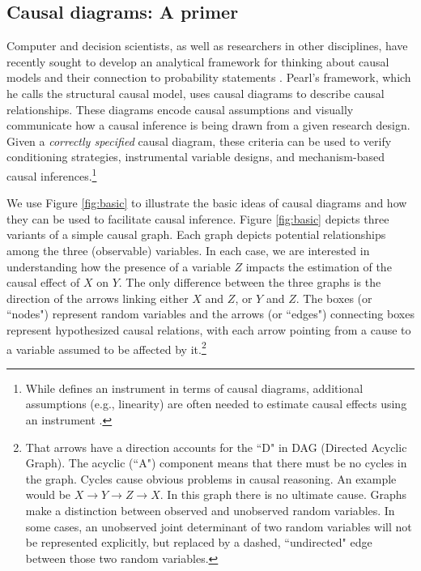 \documentclass[12pt,reqno,titlepage]{amsart}
\begin{document}
\begin{doublespace}
\subsection{Causal diagrams: A primer}
Computer and decision scientists, as well as researchers in other disciplines, have recently sought to develop an analytical framework for thinking about causal models and their connection to probability statements \citep{Pearl:2009kh}.
Pearl's framework, which he calls the structural causal model, uses causal diagrams to describe causal relationships. 
These diagrams encode causal assumptions and visually communicate how a causal inference is being drawn from a given research design.
Given a \emph{correctly specified} causal diagram, these criteria can be used to verify conditioning strategies, instrumental variable designs, and mechanism-based causal inferences.\footnote{While \citet[p.248]{Pearl:2009kh} defines an instrument in terms of causal diagrams, additional assumptions (e.g., linearity) are often needed to estimate causal effects using an instrument \citep{Angrist:1996p7456}.}

We use Figure \ref{fig:basic} to illustrate the basic ideas of causal diagrams and how they can be used to facilitate causal inference.
Figure \ref{fig:basic} depicts three variants of a simple causal graph. Each graph depicts potential relationships among the three (observable) variables.
In each case, we are interested in understanding how the presence of a variable $Z$ impacts the estimation of the causal effect of $X$ on $Y$.
The only difference between the three graphs is the direction of the arrows linking either $X$ and $Z$, or $Y$ and $Z$.
The boxes (or ``nodes") represent random variables and the arrows (or ``edges") connecting boxes represent hypothesized causal relations, with each arrow pointing from a cause to a variable assumed to be affected by it.\footnote{
That arrows have a direction accounts for the ``D" in DAG (Directed Acyclic Graph). 
The acyclic (``A") component means that there must be no cycles in the graph. 
Cycles cause obvious problems in causal reasoning.
 An example would be $X \rightarrow Y \rightarrow Z \rightarrow X$. 
In this graph there is no ultimate cause. 
Graphs make a distinction between observed and unobserved random variables.
In some cases, an unobserved joint determinant of two random variables will not be represented explicitly, but replaced by a dashed, ``undirected" edge between those two random variables.}


\end{doublespace}
\end{document}
